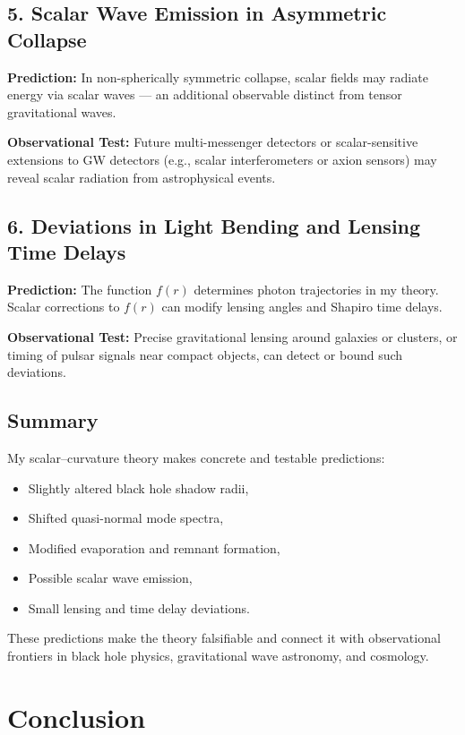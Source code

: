 \documentclass[12pt]{article}
\begin{document}
\subsection{5. Scalar Wave Emission in Asymmetric Collapse}

\textbf{Prediction:}  
In non-spherically symmetric collapse, scalar fields may radiate energy via scalar waves — an additional observable distinct from tensor gravitational waves.

\textbf{Observational Test:}  
Future multi-messenger detectors or scalar-sensitive extensions to GW detectors (e.g., scalar interferometers or axion sensors) may reveal scalar radiation from astrophysical events.

\subsection{6. Deviations in Light Bending and Lensing Time Delays}

\textbf{Prediction:}  
The function \( f(r) \) determines photon trajectories in my theory. Scalar corrections to \( f(r) \) can modify lensing angles and Shapiro time delays.

\textbf{Observational Test:}  
Precise gravitational lensing around galaxies or clusters, or timing of pulsar signals near compact objects, can detect or bound such deviations.

\subsection{Summary}

My scalar--curvature theory makes concrete and testable predictions:
\begin{itemize}
    \item Slightly altered black hole shadow radii,
    \item Shifted quasi-normal mode spectra,
    \item Modified evaporation and remnant formation,
    \item Possible scalar wave emission,
    \item Small lensing and time delay deviations.
\end{itemize}

These predictions make the theory falsifiable and connect it with observational frontiers in black hole physics, gravitational wave astronomy, and cosmology.

\section{Conclusion}
\end{document}
